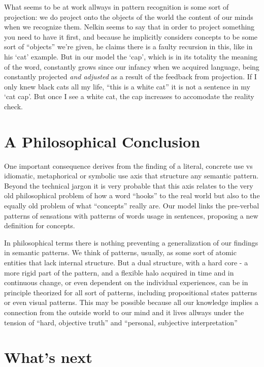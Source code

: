 \documentclass[12pt]{article}
\begin{document}
What seems to be at work allways in pattern recognition is some sort of projection: we do project onto the objects of the world the content of our minds when we recognize them. Nelkin seems to say that in order to project something you need to have it first, and because he implicitly considers concepts to be some sort of ``objects'' we're given, he claims there is a faulty recursion in this, like in his `cat' example. But in our model the `cap', which is in its totality the meaning of the word, constantly grows since our infancy when we acquired language, being constantly projected \emph{and adjusted} as a result of the feedback from projection. If I only knew black cats all my life, ``this is a white cat'' it is not a sentence in my `cat cap'. But once I see a white cat, the cap increases to accomodate the reality check.

\section{A Philosophical Conclusion}\label{a-philosophical-conclusion}

One important consequence derives from the finding of a literal, concrete use vs idiomatic, metaphorical or symbolic use axis that structure any semantic pattern. Beyond the technical jargon it is very probable that this axis relates to the very old philosophical problem of how a word ``hooks'' to the real world but also to the equally old problem of what ``concepts'' really are. Our model links the pre-verbal patterns of sensations with patterns of words usage in sentences, proposing a new definition for concepts.

In philosophical terms there is nothing preventing a generalization of our findings in semantic patterns. We think of patterns, usually, as some sort of atomic entities that lack internal structure. But a dual structure, with a hard core - a more rigid part of the pattern, and a flexible halo acquired in time and in continuous change, or even dependent on the individual experiences, can be in principle theorized for all sort of patterns, including propositional states patterns or even visual patterns. This may be possible because all our knowledge implies a connection from the outside world to our mind and it lives allways under the tension of ``hard, objective truth'' and ``personal, subjective interpretation''

\section{What's next}\label{whats-next}
\end{document}
